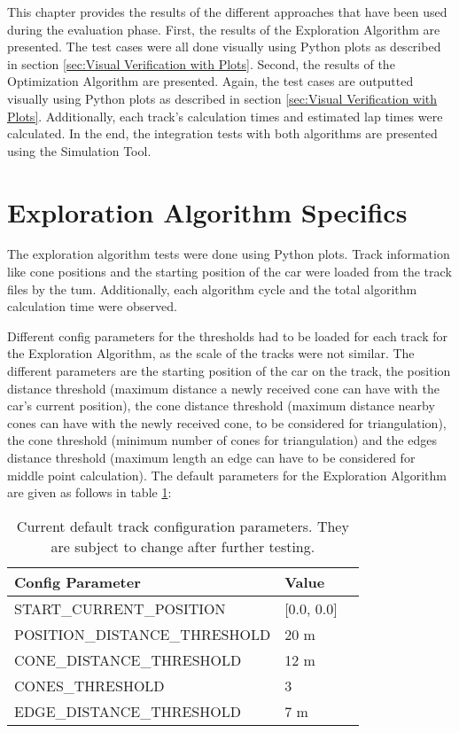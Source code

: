 This chapter provides the results of the different approaches that have been used during the evaluation phase. First, the results of the Exploration Algorithm are presented. The test cases were all done visually using Python plots as described in section \ref{sec:Visual Verification with Plots}. Second, the results of the Optimization Algorithm are presented. Again, the test cases are outputted visually using Python plots as described in section \ref{sec:Visual Verification with Plots}. Additionally, each track's calculation times and estimated lap times were calculated. In the end, the integration tests with both algorithms are presented using the Simulation Tool.

\section{Exploration Algorithm Specifics} \label{sec:Exploration Algorithm Specifics}
The exploration algorithm tests were done using Python plots. Track information like cone positions and the starting position of the car were loaded from the track files by the \acrlong{tum}. \cite{tumftm_optimization_algoritm} Additionally, each algorithm cycle and the total algorithm calculation time were observed.

Different config parameters for the thresholds had to be loaded for each track for the Exploration Algorithm, as the scale of the tracks were not similar. The different parameters are the starting position of the car on the track, the position distance threshold (maximum distance a newly received cone can have with the car's current position), the cone distance threshold (maximum distance nearby cones can have with the newly received cone, to be considered for triangulation), the cone threshold (minimum number of cones for triangulation) and the edges distance threshold (maximum length an edge can have to be considered for middle point calculation). The default parameters for the Exploration Algorithm are given as follows in table \ref{tab:Default Track Config for Exploration Algorithm}:
\begin{table}[H]
    \centering
    \begin{tabular}{|l|l|l|}
        \hline
        \textbf{Config Parameter}     & \textbf{Value} \\ \hline
        START\_CURRENT\_POSITION      & [0.0, 0.0]     \\ \hline
        POSITION\_DISTANCE\_THRESHOLD & 20 m           \\ \hline
        CONE\_DISTANCE\_THRESHOLD     & 12 m           \\ \hline
        CONES\_THRESHOLD              & 3              \\ \hline
        EDGE\_DISTANCE\_THRESHOLD     & 7 m            \\ \hline
    \end{tabular}
    \caption{Current default track configuration parameters. They are subject to change after further testing.}
    \label{tab:Default Track Config for Exploration Algorithm}
\end{table}

